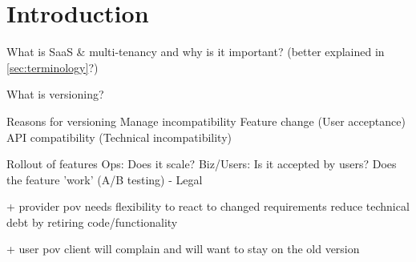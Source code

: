 \section{Introduction}

What is SaaS & multi-tenancy and why is it important? (better explained in \ref{sec:terminology}?)

What is versioning?

Reasons for versioning
  Manage incompatibility
    Feature change (User acceptance)
    API compatibility (Technical incompatibility)

  Rollout of features
    Ops: Does it scale?
    Biz/Users: Is it accepted by users? Does the feature 'work' (A/B testing)
  - Legal

  + provider pov
  needs flexibility to react to changed requirements
  reduce technical debt by retiring code/functionality

  + user pov
  client will complain and will want to stay on the old version